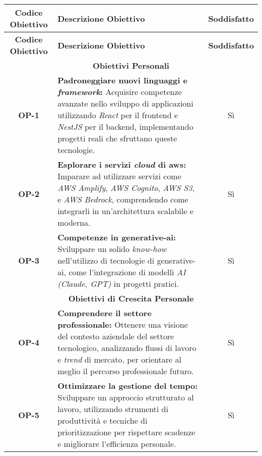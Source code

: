 \begin{longtable}{|c|>{\centering\arraybackslash}p{}|c|} %
    \hline
    \rowcolor{green!30} %
    \textbf{Codice Obiettivo} & \textbf{Descrizione Obiettivo} & \textbf{Soddisfatto}\\
    \hline
    \endfirsthead %
    
    \hline
    \rowcolor{green!30} %
    \textbf{Codice Obiettivo} & \textbf{Descrizione Obiettivo}  & \textbf{Soddisfatto}\\
    \hline
    \endhead %
    
    \hline
    \multicolumn{3}{|c|}{\rowcolor{green!30} \textbf{Obiettivi Personali}} \\
    \hline
    \textbf{OP-1} & \textbf{Padroneggiare nuovi linguaggi e \textit{framework}:} Acquisire competenze avanzate nello sviluppo di applicazioni utilizzando \textit{React} per il \gls{frontend} e \textit{NestJS} per il \gls{backend}, implementando progetti reali che sfruttano queste tecnologie. & Sì \\
    \hline
    \textbf{OP-2} & \textbf{Esplorare i servizi \textit{cloud} di \gls{aws}:} Imparare ad utilizzare servizi come \textit{AWS Amplify}, \textit{AWS Cognito}, \textit{AWS S3}, e \textit{AWS Bedrock}, comprendendo come integrarli in un’architettura scalabile e moderna. & Sì\\
    \hline
    \textbf{OP-3} & \textbf{Competenze in \gls{generative-ai}:} Sviluppare un solido \textit{know-how} nell’utilizzo di tecnologie di \gls{generative-ai}, come l’integrazione di modelli \textit{AI (Claude, GPT)} in progetti pratici.& Sì \\
    \hline
    \multicolumn{3}{|c|}{\rowcolor{green!30} \textbf{Obiettivi di Crescita Personale}} \\
    \hline
    \textbf{OP-4} & \textbf{Comprendere il settore professionale:} Ottenere una visione del contesto aziendale del settore tecnologico, analizzando flussi di lavoro e \textit{trend} di mercato, per orientare al meglio il percorso professionale futuro.& Sì \\
    \hline
    \textbf{OP-5} & \textbf{Ottimizzare la gestione del tempo:} Sviluppare un approccio strutturato al lavoro, utilizzando strumenti di produttività e tecniche di prioritizzazione per rispettare scadenze e migliorare l’efficienza personale. & Sì\\

\end{longtable}
